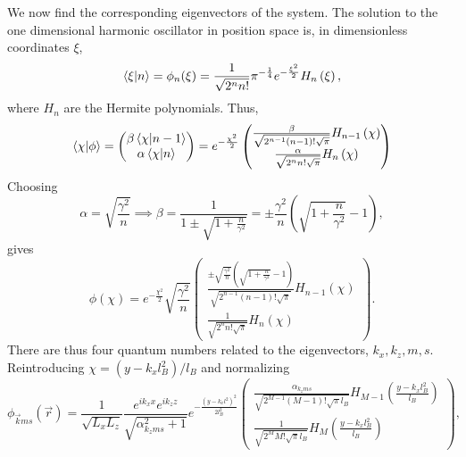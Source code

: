 We now find the corresponding eigenvectors of the system.
The solution to the one dimensional harmonic oscillator in position space is, in dimensionless coordinates $\xi$,~\cite[Eq.~18.39.5]{NIST:DLMF}
\begin{equation}
  \braket{\xi | n} = \phi _n (\xi)
  = \frac{1}{\sqrt{2^nn!}} \pi^{-\frac{1}{4}}
  e^{- \frac{\xi^2}{2}} H_n \left( \xi \right),
\end{equation}
where $H_n$ are the Hermite polynomials.
Thus,
\begin{equation}
  \braket{\chi | \phi } =
  \begin{pmatrix}
    \beta \braket{\chi | n-1}\\
    \alpha \braket{\chi | n}
  \end{pmatrix}
  =
  e^{- \frac{\chi^2}{2}}
  \begin{pmatrix}
    \frac{\beta }{\sqrt{2^{n-1}(n-1)!\sqrt{\pi }}} H_{n-1} \left( \chi \right)\\
    \frac{\alpha }{\sqrt{2^{n}n!\sqrt{\pi }}} H_n \left(\chi \right)\\
  \end{pmatrix}
\end{equation}
Choosing
\begin{equation}
  \alpha  = \sqrt{\frac{\gamma^2}{n}} \implies \beta = \frac{1}{1 \pm \sqrt{1 + \frac{n}{\gamma ^2}}} = \pm \frac{\gamma ^2}{n} \left( \sqrt{1 + \frac{n}{\gamma ^2}} - 1 \right),
\end{equation}
gives
\begin{equation}
  \phi (\chi ) = e^{-\frac{\chi^2}{2}} \sqrt{\frac{\gamma ^2}{n}}
  \begin{pmatrix}
    \frac{
      \pm \sqrt{\frac{\gamma ^2}{n}} \left( \sqrt{1 + \frac{n}{\gamma ^2}} - 1 \right)
    }{
      \sqrt{2^{n-1} (n-1)! \sqrt{\pi }}
    }
    H_{n-1}(\chi )\\
    \frac{1}{\sqrt{2^{n}n!\sqrt{\pi }}} H_n \left(\chi \right)
  \end{pmatrix}.
\end{equation}
There are thus four quantum numbers related to the eigenvectors, $k_x,  k_z, m, s$.
Reintroducing $\chi = (y-k_xl_B^2) /l_B$ and normalizing
\begin{equation}
  \phi _{\vec{k} m s}(\vec{r}) = \frac{1}{\sqrt{L_xL_z}}
  \frac{e^{ik_x x}e^{ik_z z}}{\sqrt{\alpha _{k_z m s}^2 + 1}}
  e^{-\frac{\left(y-k_x l^2\right)^2}{2 l_B^2}}
  \begin{pmatrix}
    \frac{\alpha _{k_z m s}}{\sqrt{2^{M-1} (M-1)! \sqrt{\pi } l_B}} H_{M-1}\left( \frac{y-k_x l_B^2}{l_B} \right)\\
    \frac{1}{\sqrt{2^M M! \sqrt{\pi } l_B}} H_M \left( \frac{y-k_x l_B^2}{l_B} \right)
  \end{pmatrix},
\end{equation}
